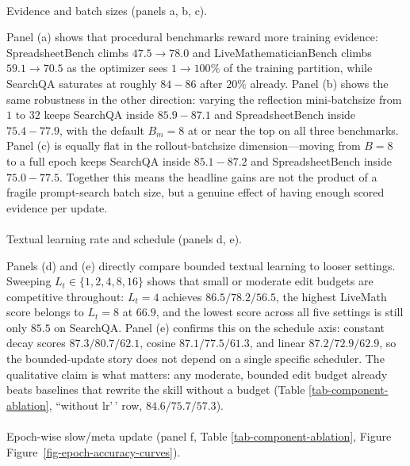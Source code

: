 \documentclass[
]{article}
\makeatletter
\let\oldparagraph\paragraph
\renewcommand{\paragraph}{
    \@ifstar
      \xxxParagraphStar
      \xxxParagraphNoStar
  }
\newcommand{\xxxParagraphStar}[1]{\oldparagraph*{#1}\mbox{}}
\newcommand{\xxxParagraphNoStar}[1]{\oldparagraph{#1}\mbox{}}
\makeatother
\begin{document}
\paragraph{Evidence and batch sizes (panels a, b,
c).}\label{evidence-and-batch-sizes-panels-a-b-c.}

Panel (a) shows that procedural benchmarks reward more training
evidence: SpreadsheetBench climbs \(47.5{\to}78.0\) and
LiveMathematicianBench climbs \(59.1{\to}70.5\) as the optimizer sees
\(1{\to}100\%\) of the training partition, while SearchQA saturates at
roughly \(84{-}86\) after \(20\%\) already. Panel (b) shows the same
robustness in the other direction: varying the reflection mini-batchsize
from \(1\) to \(32\) keeps SearchQA inside \(85.9{-}87.1\) and
SpreadsheetBench inside \(75.4{-}77.9\), with the default \(B_m{=}8\) at
or near the top on all three benchmarks. Panel (c) is equally flat in
the rollout-batchsize dimension---moving from \(B{=}8\) to a full epoch
keeps SearchQA inside \(85.1{-}87.2\) and SpreadsheetBench inside
\(75.0{-}77.5\). Together this means the headline gains are not the
product of a fragile prompt-search batch size, but a genuine effect of
having enough scored evidence per update.

\paragraph{Textual learning rate and schedule (panels d,
e).}\label{textual-learning-rate-and-schedule-panels-d-e.}

Panels (d) and (e) directly compare bounded textual learning to looser
settings. Sweeping \(L_t \in \{1,2,4,8,16\}\) shows that small or
moderate edit budgets are competitive throughout: \(L_t{=}4\) achieves
\(86.5/78.2/56.5\), the highest LiveMath score belongs to \(L_t{=}8\) at
\(66.9\), and the lowest score across all five settings is still only
\(85.5\) on SearchQA. Panel (e) confirms this on the schedule axis:
constant decay scores \(87.3/80.7/62.1\), cosine \(87.1/77.5/61.3\), and
linear \(87.2/72.9/62.9\), so the bounded-update story does not depend
on a single specific scheduler. The qualitative claim is what matters:
any moderate, bounded edit budget already beats baselines that rewrite
the skill without a budget (Table \ref{tab-component-ablation},
``without lr'\,' row, \(84.6/75.7/57.3\)).

\paragraph{\texorpdfstring{Epoch-wise slow/meta update (panel f, Table
\ref{tab-component-ablation}, Figure
Figure~\ref{fig-epoch-accuracy-curves}).}{Epoch-wise slow/meta update (panel f, Table , Figure Figure~).}}\label{epoch-wise-slowmeta-update-panel-f-table-figure-fig-epoch-accuracy-curves.}
\end{document}
